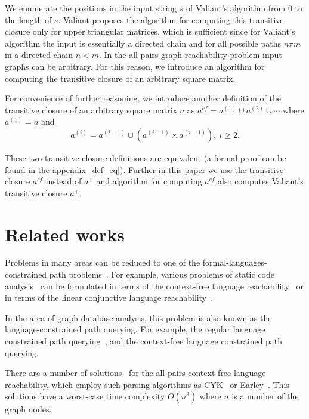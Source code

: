 \documentclass[runningheads,a4paper]{llncs}
\begin{document}
We enumerate the positions in the input string $s$ of Valiant's algorithm from 0 to the length of $s$. Valiant proposes the algorithm for computing this transitive closure only for upper triangular matrices, which is sufficient since for Valiant's algorithm the input is essentially a directed chain and for all possible paths $n \pi m$ in a directed chain $n < m$. In the all-pairs graph reachability problem input graphs can be arbitrary. For this reason, we introduce an algorithm for computing the transitive closure of an arbitrary square matrix.

For convenience of further reasoning, we introduce another definition of the transitive closure of an arbitrary square matrix $a$ as $a^{cf} = a^{(1)} \cup a^{(2)} \cup \cdots$ where $a^{(1)} = a$ and $$a^{(i)} = a^{(i-1)} \cup (a^{(i-1)} \times a^{(i-1)}), ~i \ge 2.$$

These two transitive closure definitions are equivalent (a formal proof can be found in the appendix~\ref{def_eq}). Further in this paper we use the transitive closure $a^{cf}$ instead of $a^+$ and algorithm for computing $a^{cf}$ also computes Valiant's transitive closure $a^+$.

\section{Related works} \label{section_related}%
Problems in many areas can be reduced to one of the formal-languages-constrained path problems~\cite{barrett2000formal}. For example, various problems of static code analysis~\cite{bastani2015specification,xu2009scaling} can be formulated in terms of the context-free language reachability~\cite{reps1998program} or in terms of the linear conjunctive language reachability~\cite{zhang2017context}. 

In the area of graph database analysis, this problem is also known as the language-constrained path querying. For example, the regular language constrained path querying~\cite{reutter2017regular,fan2011adding,abiteboul1997regular,nole2016regular}, and the context-free language constrained path querying.

There are a number of solutions~\cite{hellingsRelational,GraphQueryWithEarley,RDF} for the all-pairs context-free language reachability, which employ such parsing algorithms as CYK~\cite{kasami,younger} or Earley~\cite{Grune}. This solutions have a worst-case time complexity $O(n^3)$ where $n$ is a number of the graph nodes.
\end{document}
